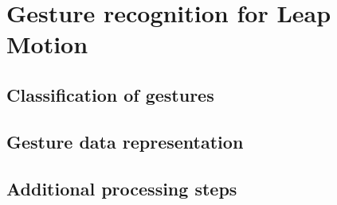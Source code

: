 \chapter{Gesture recognition for Leap Motion}

\section{Classification of gestures}

\section{Gesture data representation}

\section{Additional processing steps}


